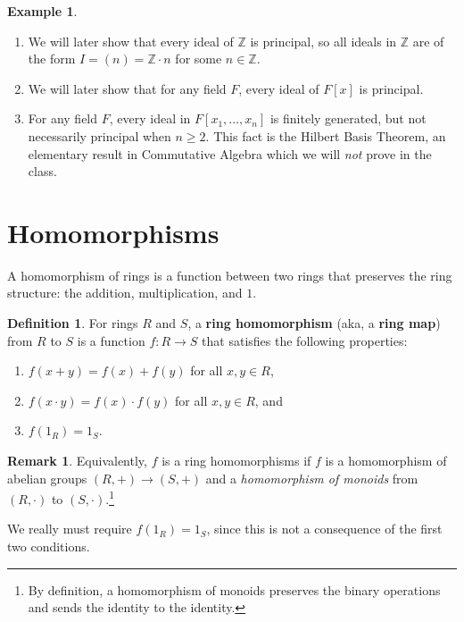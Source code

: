 \documentclass[12pt]{report}
\numberwithin{equation}{section}
\numberwithin{theorem}{chapter}
\theoremstyle{definition}
\newtheorem{definition}[theorem]{Definition}
\newtheorem{example}[theorem]{Example}
\newtheorem*{basic properties}{Basic Properties}
\newtheorem*{Important Remark}{Important Remark}
\newtheorem{remark}[theorem]{Remark}
\newcommand{\df}[1]{{\bf #1}\index{#1}}
\begin{document}
\begin{example}$\,$
\begin{enumerate}[itemsep=-0.1em]
\item We will later show that every ideal of $\mathbb{Z}$ is principal, so all ideals in $\mathbb{Z}$ are of the form $I=(n) = \mathbb{Z} \cdot n$ for some $n\in \mathbb{Z}$.
\item We will later show that for any field $F$, every ideal of $F[x]$ is principal.
\item  For any field $F$, every ideal in $F[x_1,\ldots,x_n]$ is finitely generated, but not necessarily principal when $n \geqslant 2$.  This fact is the Hilbert Basis Theorem, an elementary result in Commutative Algebra which we will \emph{not} prove in the class. 
\end{enumerate}
\end{example}




\section{Homomorphisms}


A homomorphism of rings is a function between two rings that preserves the ring structure: the addition, multiplication, and $1$.

\begin{definition} 
For rings $R$ and $S$, a \df{ring homomorphism} (aka, a \df{ring map}) from $R$ to $S$ is a function $f\!: R \to S$ that satisfies the following properties:
\begin{enumerate}[itemsep=0.1em]
\vspace{-0.3em}
\item $f(x + y) = f(x) + f(y)$ for all $x,y \in R$,
\item $f(x \cdot y) = f(x) \cdot f(y)$ for all $x,y \in R$, and
\item $f(1_R) = 1_S$. 
\end{enumerate}	
\end{definition}

\begin{remark} 
Equivalently, $f$ is a ring homomorphisms if $f$ is a homomorphism of abelian groups $(R, +) \longrightarrow (S,+)$ and a {\em homomorphism of monoids} from
  $(R, \cdot)$ to $(S, \cdot)$.\footnote{By definition, a homomorphism of monoids preserves the binary operations and sends the identity to the identity.}
\end{remark}


We really must require $f(1_R) = 1_S$, since this is not a consequence of the first two conditions.
  
\end{document}
